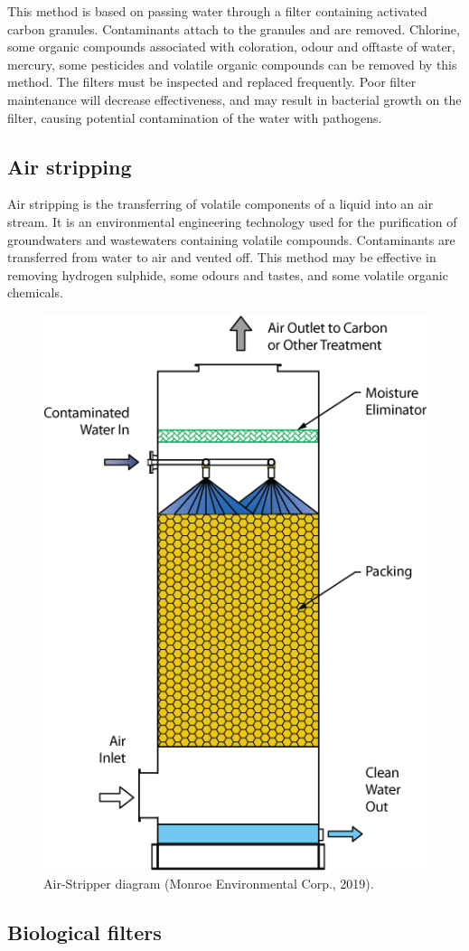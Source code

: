 \documentclass[]{book}
\begin{document}
This method is based on passing water through a filter containing activated carbon granules. Contaminants attach to the granules and are removed. Chlorine, some organic compounds associated with coloration, odour and offtaste of water, mercury, some pesticides and volatile organic compounds can be removed by this method. The filters must be inspected and replaced frequently. Poor filter maintenance will decrease effectiveness, and may result in bacterial growth on the filter, causing potential contamination of the water with pathogens.

\hypertarget{air-stripping}{%
\subsection{Air stripping}\label{air-stripping}}

Air stripping is the transferring of volatile components of a liquid into an air stream. It is an environmental engineering technology used for the purification of groundwaters and wastewaters containing volatile compounds. Contaminants are transferred from water to air and vented off. This method may be effective in removing hydrogen sulphide, some odours and tastes, and some volatile organic chemicals.

\begin{figure}

{\centering \includegraphics[width=0.35\linewidth]{figures/Air-Stripper} 

}

\caption{Air-Stripper diagram (Monroe Environmental Corp., 2019).}\label{fig:Air-Stripper}
\end{figure}

\hypertarget{biological-filters}{%
\subsection{Biological filters}\label{biological-filters}}
\end{document}
